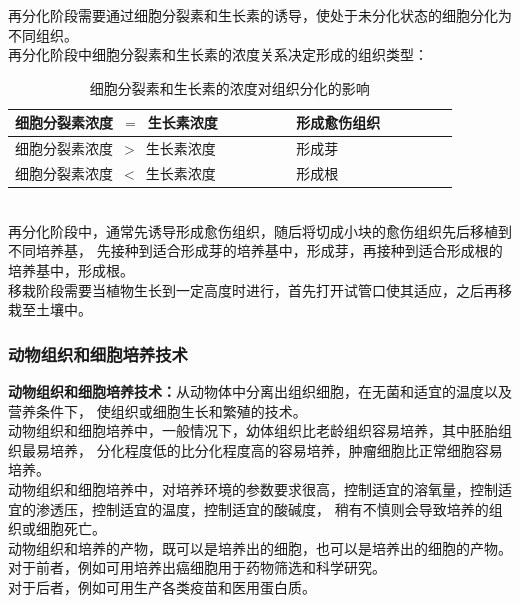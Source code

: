 \documentclass[UTF8]{ctexart}
\begin{document}
\newpage

    再分化阶段需要通过细胞分裂素和生长素的诱导，使处于未分化状态的细胞分化为不同组织。\\[3mm]
    再分化阶段中细胞分裂素和生长素的浓度关系决定形成的组织类型：\vspace{5pt}
    \begin{table}[h]
        \begin{center}
            \begin{tabular}{l|l}
                \hline
                细胞分裂素浓度~$=$~生长素浓度~~~~~~~~&形成愈伤组织~~~~~~~~\\ \hline
                细胞分裂素浓度~$>$~生长素浓度~~~~~~~~&形成芽~~~~~~~~\\ \hline
                细胞分裂素浓度~$<$~生长素浓度~~~~~~~~&形成根~~~~~~~~\\ \hline
            \end{tabular}
            \caption{细胞分裂素和生长素的浓度对组织分化的影响}
        \end{center}
    \end{table}\\
    再分化阶段中，通常先诱导形成愈伤组织，随后将切成小块的愈伤组织先后移植到不同培养基，
    先接种到适合形成芽的培养基中，形成芽，再接种到适合形成根的培养基中，形成根。\\[5mm]
    移栽阶段需要当植物生长到一定高度时进行，首先打开试管口使其适应，之后再移栽至土壤中。

\subsubsection{动物组织和细胞培养技术}
    \textbf{动物组织和细胞培养技术：}从动物体中分离出组织细胞，在无菌和适宜的温度以及营养条件下，
    使组织或细胞生长和繁殖的技术。\\[3mm]
    动物组织和细胞培养中，一般情况下，幼体组织比老龄组织容易培养，其中胚胎组织最易培养，
    分化程度低的比分化程度高的容易培养，肿瘤细胞比正常细胞容易培养。\\[3mm]
    动物组织和细胞培养中，对培养环境的参数要求很高，控制适宜的溶氧量，控制适宜的渗透压，控制适宜的温度，控制适宜的酸碱度，
    稍有不慎则会导致培养的组织或细胞死亡。\\[3mm]
    动物组织和培养的产物，既可以是培养出的细胞，也可以是培养出的细胞的产物。\\[3mm]
    对于前者，例如可用培养出癌细胞用于药物筛选和科学研究。\\[2mm]
    对于后者，例如可用生产各类疫苗和医用蛋白质。
\end{document}
